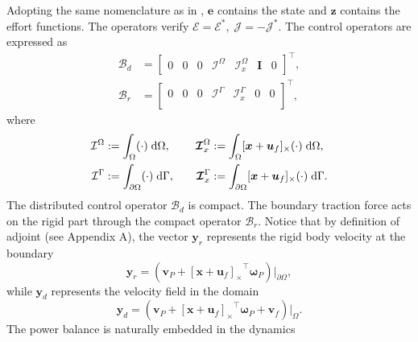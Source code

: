 \documentclass{svjour3}                     %
\newcommand{\crmat}[1]{\ensuremath{[#1]_{\times}}}
\begin{document}
Adopting the same nomenclature as in \cite{mehrmann2019structurepreserving}, $\bm{e}$ contains the state and $\bm{z}$ contains the effort functions. The operators verify $\bm{\mathcal{E}} = \bm{\mathcal{E}}^*, \; \bm{\mathcal{J}} = -\bm{\mathcal{J}}^*$. The control operators are expressed as
\begin{align*}
\bm{\mathcal{B}}_d &= 
\begin{bmatrix}
0 & 0 & 0 & \mathcal{I}^\Omega & \bm{\mathcal{I}}_{x}^\Omega & \bm{I} & 0
\end{bmatrix}^\top, \\
\bm{\mathcal{B}}_r &= 
\begin{bmatrix}
0 & 0 & 0 & \mathcal{I}^{\Gamma} & \bm{\mathcal{I}}_{x}^{\Gamma} & 0 & 0 \\
\end{bmatrix}^\top,
\end{align*}
where 
\begin{equation*}
\begin{aligned}
\mathcal{I}^\Omega &:=\int_{\Omega} (\cdot) \d{\Omega}, \\
\mathcal{I}^{\Gamma} &:= \int_{\partial \Omega} (\cdot) \d{\Gamma}, \\
\end{aligned} \qquad
\begin{aligned} 
\bm{\mathcal{I}}_{x}^\Omega &:=\int_{\Omega} \crmat{\bm{x}+\bm{u}_f} (\cdot) \d{\Omega}, \\
\bm{\mathcal{I}}_{x}^{\Gamma} &:=\int_{\partial \Omega} \crmat{\bm{x}+\bm{u}_f} (\cdot) \d{\Gamma}. \\
\end{aligned}
\end{equation*}
The distributed control operator $\bm{\mathcal{B}}_d$  is compact. The boundary traction force acts on the rigid part through the compact operator $\bm{\mathcal{B}}_r$. Notice that by definition of adjoint (see Appendix A), the vector $\bm{y}_r$ represents the rigid body velocity at the boundary
\[
\bm{y}_r = (\bm{v}_P + \crmat{\bm{x}+\bm{u}_f}^\top \bm{\omega}_P)\vert_{\partial\Omega},
\] 
while $\bm{y}_d$ represents the velocity field in the domain
\[
\bm{y}_d = (\bm{v}_P + \crmat{\bm{x}+\bm{u}_f}^\top \bm{\omega}_P + \bm{v}_f)\vert_{\Omega}.
\]
The power balance is naturally embedded in the dynamics 
\end{document}
